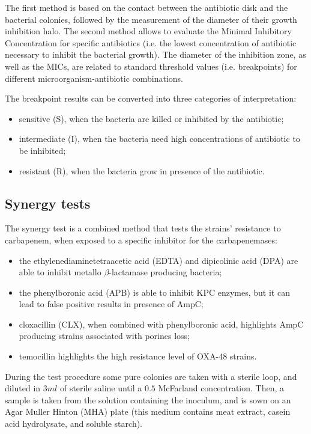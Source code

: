 \documentclass[11pt]{report}
\begin{document}
The first method is based on the contact between the antibiotic disk and the bacterial colonies, followed by the measurement of the diameter of their growth inhibition halo.
The second method allows to evaluate the Minimal Inhibitory Concentration for specific antibiotics (i.e. the lowest concentration of antibiotic necessary to inhibit the bacterial growth).
The diameter of the inhibition zone, as well as the MICs, are related to standard threshold values (i.e. breakpoints) for different microorganism-antibiotic combinations.

The breakpoint results can be converted into three categories of interpretation:
\begin{itemize}
\item sensitive (S), when the bacteria are killed or inhibited by the antibiotic;
\item intermediate (I), when the bacteria need high concentrations of antibiotic to be inhibited;
\item resistant (R), when the bacteria grow in presence of the antibiotic.
\end{itemize}

\subsection{Synergy tests}
The synergy test is a combined method that tests the strains' resistance to carbapenem, when exposed to a specific inhibitor for the carbapenemases:
\begin{itemize}
\item the ethylenediaminetetraacetic acid (EDTA) and dipicolinic acid (DPA) are able to inhibit metallo $\beta$-lactamase producing bacteria;
\item the phenylboronic acid (APB) is able to inhibit KPC enzymes, but it can lead to false positive results in presence of AmpC;
\item cloxacillin (CLX), when combined with phenylboronic acid, highlights AmpC producing strains associated with porines loss;
\item temocillin highlights the high resistance level of OXA-48 strains.
\end{itemize}

During the test procedure some pure colonies are taken with a sterile loop, and diluted in $3ml$ of sterile saline until a $0.5$ McFarland concentration.
Then, a sample is taken from the solution containing the inoculum, and is sown on an Agar Muller Hinton (MHA) plate (this medium contains meat extract, casein acid hydrolysate, and soluble starch).
\end{document}
